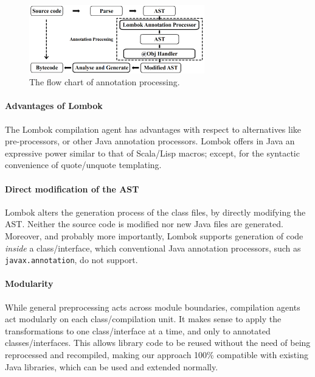 
\begin{figure}[t]
\saveSpaceFig
\centering
\includegraphics[width=3in]{pdfs/lombok3.png}
\caption{The flow chart of \mixin annotation processing.
}
\label{fig:lombok}
\saveSpaceFig
\end{figure}

\paragraph{Advantages of Lombok}
The Lombok compilation agent has advantages with respect to alternatives like
pre-processors, or other Java annotation processors.
Lombok offers in Java an expressive power similar to that of Scala/Lisp macros;
except, for the syntactic convenience of quote/unquote templating.

\paragraph{Direct modification of the AST}
Lombok alters the generation process of the class files,
by directly modifying the AST. Neither the source code is modified nor
new Java files are generated. Moreover, and probably more importantly,
Lombok supports generation of code \emph{inside} a class/interface,
which conventional Java annotation processors, such as \texttt{javax.annotation}, do not support.

\paragraph{Modularity}
While general preprocessing acts across module boundaries, compilation
agents act modularly on each class/compilation unit. It makes sense to
apply the transformations to one class/interface at a time, and only to
annotated classes/interfaces. This allows library code to be reused
without the need of being reprocessed and recompiled, making our
approach 100\% compatible with existing Java libraries, which can be
used and extended normally.


